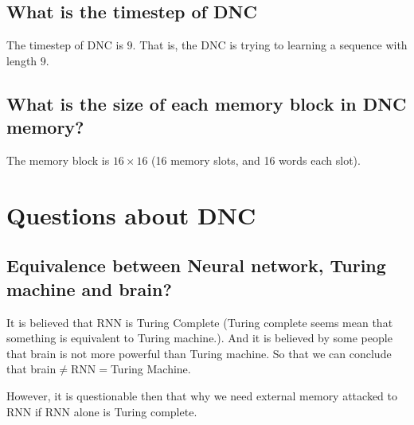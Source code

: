 \documentclass{article}
\begin{document}
\subsection{What is the timestep of DNC}
The timestep of DNC is $9$. That is, the DNC is trying to learning a sequence with length $9$.

\subsection{What is the size of each memory block in DNC memory?}
The memory block is $16\times16$ (16 memory slots, and 16 words each slot).

\section{Questions about DNC}
\subsection{Equivalence between Neural network, Turing machine and brain?}
It is believed that RNN is Turing Complete (Turing complete seems mean that something is equivalent to Turing machine.). And it is believed by some people that brain is not more powerful than Turing machine. So that we can conclude that brain$\neq$RNN$=$Turing Machine.

However, it is questionable then that why we need external memory attacked to RNN if RNN alone is Turing complete.
\end{document}
